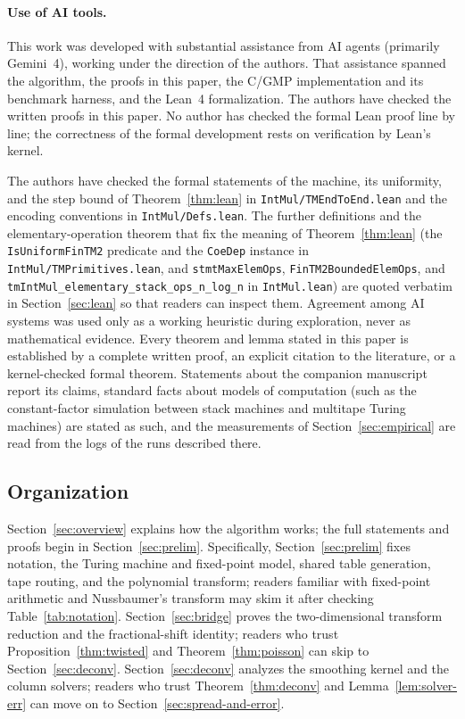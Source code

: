 {\sloppy\paragraph{Use of AI tools.}
This work was developed with substantial assistance from AI agents (primarily Gemini~4), working under the direction of the authors. That assistance spanned the algorithm, the proofs in this paper, the C/GMP implementation and its benchmark harness, and the Lean~4 formalization. The authors have checked the written proofs in this paper. No author has checked the formal Lean proof line by line; the correctness of the formal development rests on verification by Lean's kernel.

The authors have checked the formal statements of the machine, its uniformity, and the step bound of Theorem~\ref{thm:lean} in \texttt{IntMul/TMEndToEnd.lean} and the encoding conventions in \texttt{IntMul/Defs.lean}. The further definitions and the elementary-operation theorem that fix the meaning of Theorem~\ref{thm:lean} (the \texttt{IsUniformFinTM2} predicate and the \texttt{CoeDep} instance in \texttt{IntMul/TMPrimitives.lean}, and \texttt{stmtMaxElemOps}, \texttt{FinTM2BoundedElemOps}, and \texttt{tmIntMul\_\allowbreak elementary\_\allowbreak stack\_\allowbreak ops\_\allowbreak n\_\allowbreak log\_\allowbreak n} in \texttt{IntMul.lean}) are quoted verbatim in Section~\ref{sec:lean} so that readers can inspect them. Agreement among AI systems was used only as a working heuristic during exploration, never as mathematical evidence. Every theorem and lemma stated in this paper is established by a complete written proof, an explicit citation to the literature, or a kernel-checked formal theorem. Statements about the companion manuscript report its claims, standard facts about models of computation (such as the constant-factor simulation between stack machines and multitape Turing machines) are stated as such, and the measurements of Section~\ref{sec:empirical} are read from the logs of the runs described there.\par}

\subsection{Organization}\label{sec:intro-org}

Section~\ref{sec:overview} explains how the algorithm works; the full statements and proofs begin in Section~\ref{sec:prelim}. Specifically, Section~\ref{sec:prelim} fixes notation, the Turing machine and fixed-point model, shared table generation, tape routing, and the polynomial transform; readers familiar with fixed-point arithmetic and Nussbaumer's transform may skim it after checking Table~\ref{tab:notation}. Section~\ref{sec:bridge} proves the two-dimensional transform reduction and the fractional-shift identity; readers who trust Proposition~\ref{thm:twisted} and Theorem~\ref{thm:poisson} can skip to Section~\ref{sec:deconv}. Section~\ref{sec:deconv} analyzes the smoothing kernel and the column solvers; readers who trust Theorem~\ref{thm:deconv} and Lemma~\ref{lem:solver-err} can move on to Section~\ref{sec:spread-and-error}.


